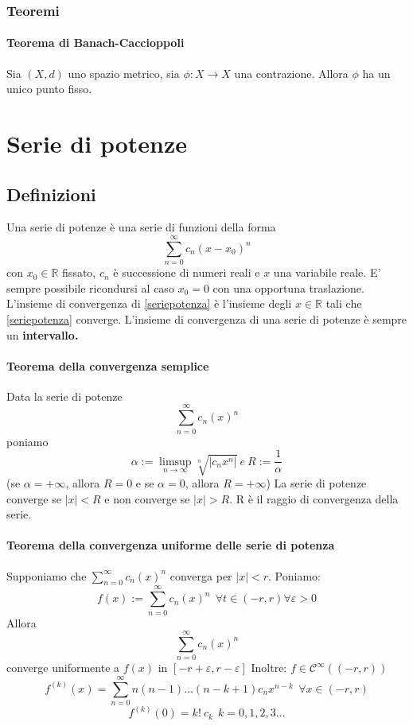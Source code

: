 \documentclass[a4paper,12pt]{article}
\newcommand{\cont}{\mathscr{C}}
\begin{document}
\subsubsection{Teoremi}
\paragraph{Teorema di Banach-Caccioppoli}
Sia $(X, d)$ uno spazio metrico, sia $\phi : X\rightarrow X$ una contrazione.
Allora $\phi$ ha un unico punto fisso.

\section{Serie di potenze}
\subsection{Definizioni}
Una serie di potenze è una serie di funzioni della forma
$$\label{seriepotenza} \displaystyle \sum_{n=0}^\infty c_n\left(x-x_0\right)^n$$
con $x_0 \in \mathbb{R}$ fissato, ${c_n}$ è successione di numeri reali e $x$ una variabile reale. 
E' sempre possibile ricondursi al caso $x_0 = 0$ con una opportuna traslazione. L'insieme di convergenza di \ref{seriepotenza} è l'insieme degli $x \in \mathbb{R}$ tali che \ref{seriepotenza} converge. L'insieme di convergenza di una serie di potenze è sempre un \textbf{intervallo.}
\paragraph{Teorema della convergenza semplice}
Data la serie di potenze 
$$ \displaystyle \sum_{n=0}^\infty c_n\left(x\right)^n$$
poniamo $$ \alpha:=\limsup_{n\to \infty} \sqrt[n]{|c_n x^n|} \ e \ R:=\frac{1}{\alpha}$$
(se $\alpha = +\infty$, allora $R=0$ e se $\alpha=0$, allora $R=+\infty$)
La serie di potenze converge se $|x|<R$ e non converge se $|x|>R$.
R è il raggio di convergenza della serie.
\paragraph{Teorema della convergenza uniforme delle serie di potenza}
Supponiamo che $ \displaystyle \sum_{n=0}^\infty c_n\left(x\right)^n$ converga per $|x|<r$. Poniamo:
$$ f(x):= \displaystyle \sum_{n=0}^\infty c_n\left(x\right)^n \ \ \forall t \in (-r,r) \forall \varepsilon > 0 $$
Allora $$ \displaystyle \sum_{n=0}^\infty c_n\left(x\right)^n$$ converge uniformente a $f(x)$ in $[-r+\varepsilon,r-\varepsilon]$ Inoltre: $f \in \cont^\infty((-r,r))$ $$f^{(k)}(x) = \displaystyle \sum_{n=0}^\infty n(n-1)\dots(n-k+1)c_n x^{n-k} \ \ \forall x \in (-r,r)$$  $$f^{(k)}(0) = k!\ c_k \ \ k=0,1,2,3 \dots $$ 
\end{document}
